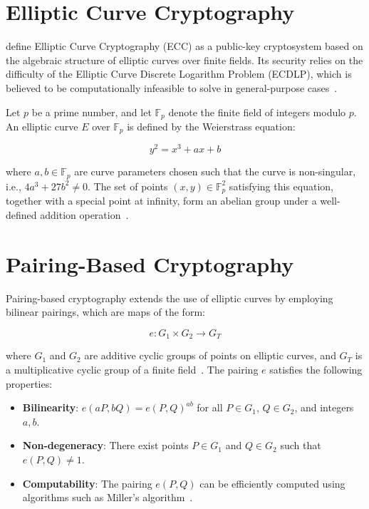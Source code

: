 \documentclass[cic,tc,english]{iiufrgs}
\begin{document}
    \section{Elliptic Curve Cryptography}
        \label{sec:ecc}

        \citet{hankerson2004guide} define Elliptic Curve Cryptography (ECC) as a public-key cryptosystem based on the algebraic structure of elliptic curves over finite fields. Its security relies on the difficulty of the Elliptic Curve Discrete Logarithm Problem (ECDLP), which is believed to be computationally infeasible to solve in general-purpose cases~\citep{hankerson2004guide, koblitz1987elliptic}.

        Let $p$ be a prime number, and let $\mathbb{F}_p$ denote the finite field of integers modulo $p$. An elliptic curve $E$ over $\mathbb{F}_p$ is defined by the Weierstrass equation:

        \begin{equation}
        \label{eq:elliptic_curve}
        y^2 = x^3 + ax + b
        \end{equation}

        where $a, b \in \mathbb{F}_p$ are curve parameters chosen such that the curve is non-singular, i.e., $4a^3 + 27b^2 \neq 0$. The set of points $(x, y) \in \mathbb{F}_p^2$ satisfying this equation, together with a special point at infinity, form an abelian group under a well-defined addition operation~\citep{hankerson2004guide}.

    \section{Pairing-Based Cryptography}
        \label{sec:pairing}

        Pairing-based cryptography extends the use of elliptic curves by employing bilinear pairings, which are maps of the form:

        \begin{equation}
        e: G_1 \times G_2 \rightarrow G_T
        \end{equation}

        where $G_1$ and $G_2$ are additive cyclic groups of points on elliptic curves, and $G_T$ is a multiplicative cyclic group of a finite field~\citep{boneh2001identity}. The pairing $e$ satisfies the following properties:

        \begin{itemize}
            \item \textbf{Bilinearity}: $e(aP, bQ) = e(P, Q)^{ab}$ for all $P \in G_1$, $Q \in G_2$, and integers $a, b$.
            \item \textbf{Non-degeneracy}: There exist points $P \in G_1$ and $Q \in G_2$ such that $e(P, Q) \neq 1$.
            \item \textbf{Computability}: The pairing $e(P, Q)$ can be efficiently computed using algorithms such as Miller's algorithm~\citep{miller1986use}.
        \end{itemize}
\end{document}
